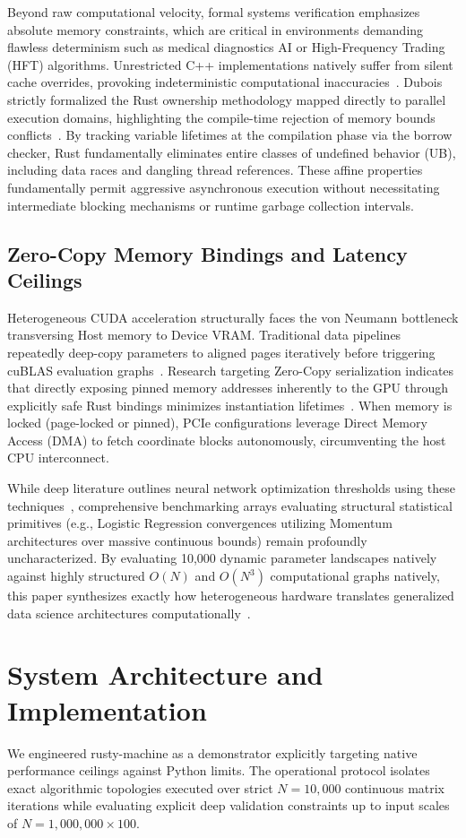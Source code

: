 \documentclass[conference]{IEEEtran}
\begin{document}
Beyond raw computational velocity, formal systems verification emphasizes absolute memory constraints, which are critical in environments demanding flawless determinism such as medical diagnostics AI or High-Frequency Trading (HFT) algorithms. Unrestricted C++ implementations natively suffer from silent cache overrides, provoking indeterministic computational inaccuracies~\cite{ref19,ref11,ref20}. Dubois strictly formalized the Rust ownership methodology mapped directly to parallel execution domains, highlighting the compile-time rejection of memory bounds conflicts~\cite{ref7}. By tracking variable lifetimes at the compilation phase via the borrow checker, Rust fundamentally eliminates entire classes of undefined behavior (UB), including data races and dangling thread references. These affine properties fundamentally permit aggressive asynchronous execution without necessitating intermediate blocking mechanisms or runtime garbage collection intervals.
\subsection{Zero-Copy Memory Bindings and Latency Ceilings}
Heterogeneous CUDA acceleration structurally faces the von Neumann bottleneck transversing Host memory to Device VRAM. Traditional data pipelines repeatedly deep-copy parameters to aligned pages iteratively before triggering cuBLAS evaluation graphs~\cite{ref14,ref16}. Research targeting Zero-Copy serialization indicates that directly exposing pinned memory addresses inherently to the GPU through explicitly safe Rust bindings minimizes instantiation lifetimes~\cite{ref18,ref21,ref13}. When memory is locked (page-locked or pinned), PCIe configurations leverage Direct Memory Access (DMA) to fetch coordinate blocks autonomously, circumventing the host CPU interconnect.

While deep literature outlines neural network optimization thresholds using these techniques~\cite{ref9,ref21}, comprehensive benchmarking arrays evaluating structural statistical primitives (e.g., Logistic Regression convergences utilizing Momentum architectures over massive continuous bounds) remain profoundly uncharacterized. By evaluating 10,000 dynamic parameter landscapes natively against highly structured $O(N)$ and $O(N^3)$ computational graphs natively, this paper synthesizes exactly how heterogeneous hardware translates generalized data science architectures computationally~\cite{ref23,ref24,ref25,ref26,ref27,ref28,ref29,ref30}.
\section{System Architecture and Implementation}
\label{sec:methods}
We engineered rusty-machine as a demonstrator explicitly targeting native performance ceilings against Python limits. The operational protocol isolates exact algorithmic topologies executed over strict $N = 10,000$ continuous matrix iterations while evaluating explicit deep validation constraints up to input scales of $N=1,000,000 \times 100$.
\end{document}
